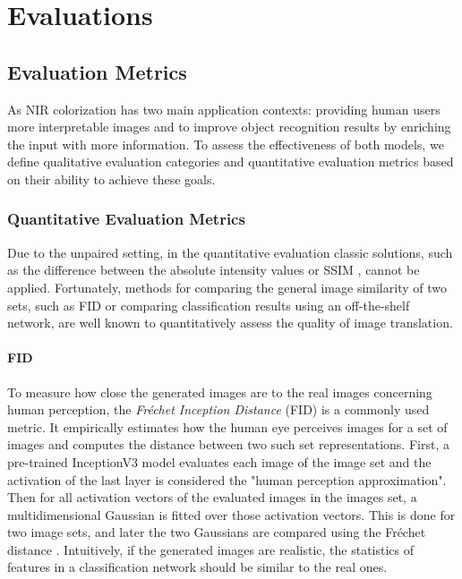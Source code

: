 \chapter{Evaluations}

\section{Evaluation Metrics}

As NIR colorization has two main application contexts: providing human users more interpretable images and to improve object recognition results by enriching the input with more information.
To assess the effectiveness of both models, we define qualitative evaluation categories and quantitative evaluation metrics based on their ability to achieve these goals.

\subsection{Quantitative Evaluation Metrics}
Due to the unpaired setting, in the quantitative evaluation classic solutions, such as the difference between the absolute intensity values or SSIM \parencite{ssim}, cannot be applied. Fortunately, methods for comparing the general image similarity of two sets, such as FID \parencite{ttur} or
comparing classification results using an off-the-shelf network, are well known to quantitatively assess the quality of image translation.

\subsubsection*{FID}
To measure how close the generated images are to the real images concerning human perception, the \textit{Fréchet Inception Distance} (FID) \parencite{ttur} is a commonly used metric.
It empirically estimates how the human eye perceives images for a set of images and computes the distance between two such set representations.
First, a pre-trained InceptionV3 model evaluates each image of the image set and the activation of the last layer is considered the "human perception approximation".
Then for all activation vectors of the evaluated images in the images set, a multidimensional Gaussian is fitted over those activation vectors.
This is done for two image sets, and later the two Gaussians are compared using the Fréchet distance \parencite{ttur}.
Intuitively, if the generated images are realistic, the statistics of features in a classification network should be similar to the real ones.

